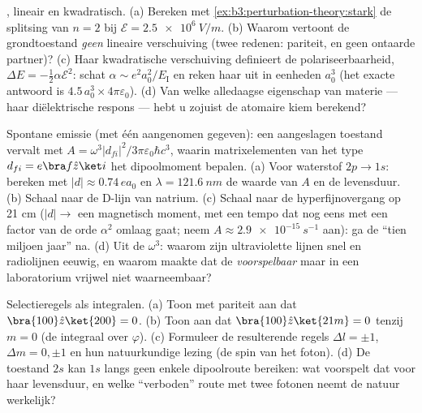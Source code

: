 \begin{exercise}[$\star\star$]\label{exo:b3:perturbation-theory:7}
, lineair en kwadratisch. (a) Bereken met
\cref{ex:b3:perturbation-theory:stark} de splitsing van $n = 2$ bij
$\mathcal E = \qty{2.5e6}{V/m}$. (b) Waarom vertoont de grondtoestand
\emph{geen} lineaire verschuiving (twee redenen: pariteit, en geen
ontaarde partner)? (c) Haar kwadratische verschuiving definieert de
polariseerbaarheid, $\Delta E = -\tfrac12\alpha\mathcal E^2$: schat
$\alpha \sim e^2a_0^2/E_{\text{I}}$ en reken haar uit in eenheden
$a_0^3$ (het exacte antwoord is $4.5\,a_0^3 \times
4\pi\varepsilon_0$). (d) Van welke alledaagse eigenschap van materie ---
haar diëlektrische respons --- hebt u zojuist de atomaire kiem berekend?
\end{exercise}

\begin{exercise}[$\star\star$]\label{exo:b3:perturbation-theory:8}
Spontane emissie (met één aangenomen gegeven): een aangeslagen toestand
vervalt met $A = \omega^3|d_{fi}|^2/3\pi\varepsilon_0\hbar c^3$, waarin
matrixelementen van het type $d_{fi} = e\bra f\hat z\ket i$ het
dipoolmoment bepalen. (a) Voor waterstof $2p \to 1s$: bereken met $|d| \approx 0.74\,
ea_0$ en $\lambda = \qty{121.6}{nm}$ de waarde van $A$ en de
levensduur. (b) Schaal naar de D-lijn van natrium. (c) Schaal naar de
hyperfijnovergang op 21 cm ($|d| \to$ een magnetisch moment, met een
tempo dat nog eens met een factor van de orde $\alpha^2$ omlaag gaat; neem
$A \approx
\qty{2.9e-15}{s^{-1}}$ aan): ga de ``tien miljoen jaar'' na.
(d) Uit de $\omega^3$: waarom zijn ultraviolette lijnen snel en radiolijnen
eeuwig, en waarom maakte dat de  \emph{voorspelbaar} maar in
een laboratorium vrijwel niet waarneembaar?
\end{exercise}

\begin{exercise}[$\star\star$]\label{exo:b3:perturbation-theory:9}
Selectieregels als integralen. (a) Toon met pariteit aan dat
$\bra{100}\hat z\ket{200} =
0$. (b) Toon aan dat $\bra{100}\hat z\ket{21m} = 0$ tenzij $m =
0$ (de integraal over $\varphi$). (c)
Formuleer de resulterende regels $\Delta
l = \pm1$, $\Delta m = 0, \pm1$
en hun natuurkundige lezing (de spin van het foton). (d) De toestand $2s$
kan $1s$ langs geen enkele dipoolroute bereiken: wat voorspelt dat voor
haar levensduur, en welke ``verboden'' route met twee fotonen neemt de
natuur werkelijk?
\end{exercise}

